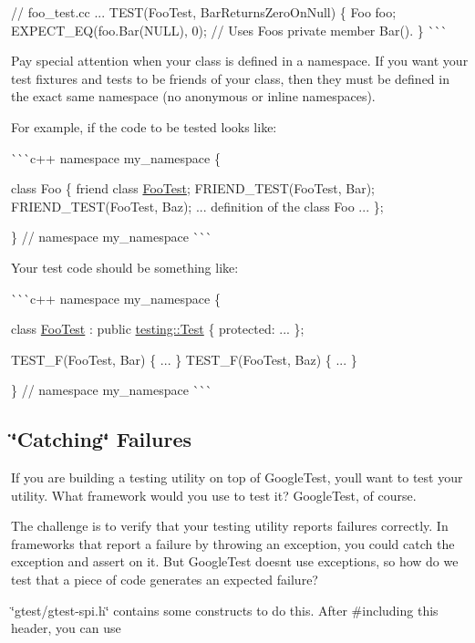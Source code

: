 \begin{DoxyItemize}
// foo\+\_\+test.\+cc ... T\+E\+S\+T(\+Foo\+Test, Bar\+Returns\+Zero\+On\+Null) \{ Foo foo; E\+X\+P\+E\+C\+T\+\_\+\+EQ(foo.\+Bar(\+N\+U\+L\+L), 0); // Uses Foo\textquotesingle{}s private member Bar(). \} \`{}\`{}\`{}

Pay special attention when your class is defined in a namespace. If you want your test fixtures and tests to be friends of your class, then they must be defined in the exact same namespace (no anonymous or inline namespaces).

For example, if the code to be tested looks like\+:

\`{}\`{}\`{}c++ namespace my\+\_\+namespace \{

class Foo \{ friend class \mbox{\hyperlink{classFooTest}{Foo\+Test}}; F\+R\+I\+E\+N\+D\+\_\+\+T\+E\+S\+T(\+Foo\+Test, Bar); F\+R\+I\+E\+N\+D\+\_\+\+T\+E\+S\+T(\+Foo\+Test, Baz); ... definition of the class Foo ... \};

\} // namespace my\+\_\+namespace \`{}\`{}\`{}

Your test code should be something like\+:

\`{}\`{}\`{}c++ namespace my\+\_\+namespace \{

class \mbox{\hyperlink{classFooTest}{Foo\+Test}} \+: public \mbox{\hyperlink{classtesting_1_1Test}{testing\+::\+Test}} \{ protected\+: ... \};

T\+E\+S\+T\+\_\+\+F(\+Foo\+Test, Bar) \{ ... \} T\+E\+S\+T\+\_\+\+F(\+Foo\+Test, Baz) \{ ... \}

\} // namespace my\+\_\+namespace \`{}\`{}\`{}
\end{DoxyItemize}

\subsection*{\char`\"{}\+Catching\char`\"{} Failures}

If you are building a testing utility on top of Google\+Test, you\textquotesingle{}ll want to test your utility. What framework would you use to test it? Google\+Test, of course.

The challenge is to verify that your testing utility reports failures correctly. In frameworks that report a failure by throwing an exception, you could catch the exception and assert on it. But Google\+Test doesn\textquotesingle{}t use exceptions, so how do we test that a piece of code generates an expected failure?

{\ttfamily \char`\"{}gtest/gtest-\/spi.\+h\char`\"{}} contains some constructs to do this. After \#including this header, you can use


